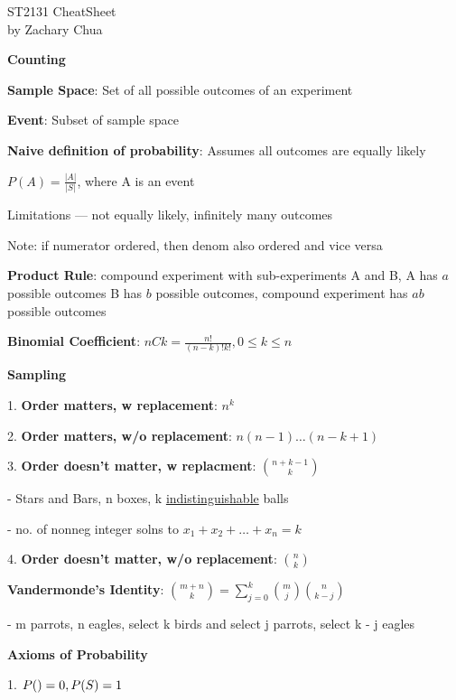 \documentclass[10pt, a4paper]{article}
\author{Zachary Chua Yan Ern}
\date{April 2022}
\newcommand{\blue}[1]{{\color{MidnightBlue}#1}}
\newcommand{\red}[1]{{\color{red}#1}}
\newcommand{\header}[1]{{\normalsize\textbf{#1}}}
\newcommand{\tab}[0]{\hspace*{2mm}}
\begin{document}
	\scriptsize %
	\setlength\parindent{0pt}
	\setlength{\columnseprule}{0.1pt}
	
	\begin{center}
		{\large ST2131 CheatSheet}\\
		by Zachary Chua
	\end{center}

	\begin{multicols*}{3}
		\header{Counting}

		\textbf{Sample Space}: Set of all possible outcomes of an experiment

		\textbf{Event}: Subset of sample space

		\textbf{Naive definition of probability}: Assumes all outcomes are \blue{equally likely}

		$P(A) = \frac{|A|}{|S|}$, where A is an event

		\red{Limitations} --- not equally likely, infinitely many outcomes

		\red{Note}: if numerator ordered, then denom also ordered and vice versa

		\textbf{Product Rule}: compound experiment with sub-experiments A and B, A has $a$ possible outcomes
		B has $b$ possible outcomes, compound experiment has $ab$ possible outcomes

		\textbf{Binomial Coefficient}: $nCk = \frac{n!}{(n - k)!k!}, 0 \leq k \leq n$

		\textbf{Sampling}

		1. \textbf{Order matters, w replacement}: $n^k$

		2. \textbf{Order matters, w/o replacement}: $n(n-1)\dots(n-k+1)$

		3. \textbf{Order \red{doesn't} matter, w replacment}: $\binom{n + k - 1}{k}$

		\tab{} - Stars and Bars, n boxes, k \underline{indistinguishable} balls

		\tab{} - no. of nonneg integer solns to $x_1 + x_2 + \dots + x_n = k$

		4. \textbf{Order \red{doesn't} matter, w/o replacement}: $\binom{n}{k}$

		\textbf{Vandermonde's Identity}: $\binom{m + n}{k} = \sum_{j =0}^{k} \binom{m}{j} \binom{n}{k - j}$

		\tab{} - m parrots, n eagles, select k birds and select j parrots, select k - j eagles

		\textbf{Axioms of Probability}

		1. $P(\null) = 0, P(S) = 1$


\end{multicols*}
\end{document}
